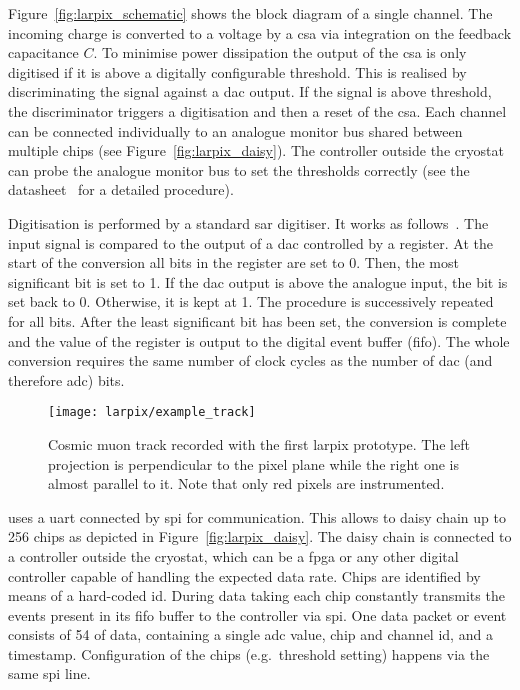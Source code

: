 Figure~\ref{fig:larpix_schematic} shows the block diagram of a single \larpix{} channel.
The incoming charge is converted to a voltage by a \gls{csa} via integration on the feedback capacitance $C$.
To minimise power dissipation the output of the \gls{csa} is only digitised if it is above a digitally configurable threshold.
This is realised by discriminating the signal against a \gls{dac} output.
If the signal is above threshold, the discriminator triggers a digitisation and then a reset of the \gls{csa}.
Each channel can be connected individually to an analogue monitor bus shared between multiple \larpix{} chips (see Figure~\ref{fig:larpix_daisy}).
The \larpix{} controller outside the cryostat can probe the analogue monitor bus to set the thresholds correctly (see the datasheet~\cite{larpix_spec} for a detailed procedure).

Digitisation is performed by a standard \gls{sar} digitiser.
It works as follows~\cite{horowitzHill}.
The input signal is compared to the output of a \gls{dac} controlled by a register.
At the start of the conversion all bits in the register are set to \num{0}.
Then, the most significant bit is set to \num{1}.
If the \gls{dac} output is above the analogue input, the bit is set back to \num{0}.
Otherwise, it is kept at \num{1}.
The procedure is successively repeated for all bits.
After the least significant bit has been set, the conversion is complete and the value of the register is output to the digital event buffer (\gls{fifo}).
The whole conversion requires the same number of clock cycles as the number of \gls{dac} (and therefore \gls{adc}) bits.

\begin{figure}[tbp]
	\centering
	\texttt{[image: larpix/example\_track]}
	\caption[ prototype event]{%
		Cosmic muon track recorded with the first \acrshort{larpix} prototype.
		The left projection is perpendicular to the pixel plane while the right one is almost parallel to it.
		Note that only red pixels are instrumented.~\cite{danLarpix}
	}
	\label{fig:larpix_track}
\end{figure}

\larpix{} uses a \gls{uart} connected by \gls{spi} for communication.
This allows to daisy chain up to \num{256} \larpix{} chips as depicted in Figure~\ref{fig:larpix_daisy}.
The daisy chain is connected to a \larpix{} controller outside the cryostat, which can be a \gls{fpga} or any other digital controller capable of handling the expected data rate.
Chips are identified by means of a hard-coded \gls{id}.
During data taking each \larpix{} chip constantly transmits the events present in its \gls{fifo} buffer to the controller via \gls{spi}.
One data packet or event consists of \SI{54}{\bit} of data, containing a single \gls{adc} value, chip and channel \gls{id}, and a timestamp.
Configuration of the \larpix{} chips (e.g.\ threshold setting) happens via the same \gls{spi} line.

